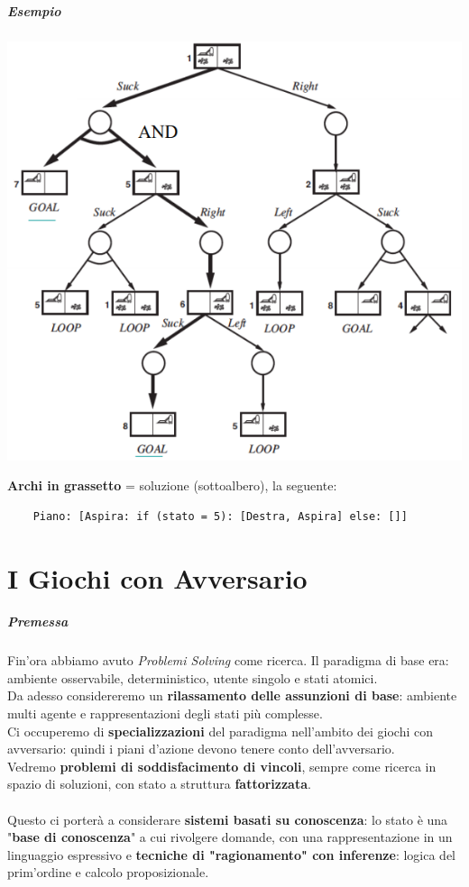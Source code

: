 \documentclass[10pt]{book}
\begin{document}
\paragraph{Esempio}
\begin{center}
	\includegraphics[scale=0.7]{andortree.png}
\end{center}
\textbf{Archi in grassetto} = soluzione (sottoalbero), la seguente:
\begin{lstlisting}
	Piano: [Aspira: if (stato = 5): [Destra, Aspira] else: []]
\end{lstlisting}
\chapter{I Giochi con Avversario}
\paragraph{Premessa}
Fin'ora abbiamo avuto \textit{Problemi Solving} come ricerca. Il paradigma di base era: ambiente osservabile, deterministico, utente singolo e stati atomici.\\
Da adesso considereremo un \textbf{rilassamento delle assunzioni di base}: ambiente multi agente e rappresentazioni degli stati più complesse.\\
Ci occuperemo di \textbf{specializzazioni} del paradigma nell'ambito dei giochi con avversario: quindi i piani d'azione devono tenere conto dell'avversario.\\
Vedremo \textbf{problemi di soddisfacimento di vincoli}, sempre come ricerca in spazio di soluzioni, con stato a struttura \textbf{fattorizzata}.\\\\
Questo ci porterà a considerare \textbf{sistemi basati su conoscenza}: lo stato è una "\textbf{base di conoscenza}" a cui rivolgere domande, con una rappresentazione in un linguaggio espressivo e \textbf{tecniche di "ragionamento" con inferenze}: logica del prim'ordine e calcolo proposizionale.
\end{document}
